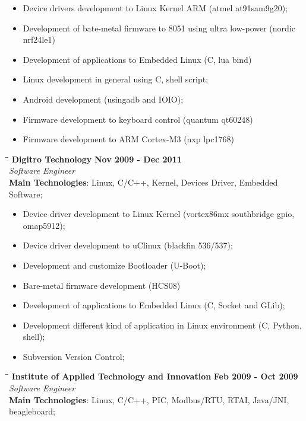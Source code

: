 \documentclass[margin]{eder}
\begin{document}
\begin{resume}
\begin{itemize}
  \item Device drivers development to Linux Kernel ARM (atmel at91sam9g20);
  \item Development of bate-metal firmware to 8051 using ultra low-power (nordic nrf24le1)
  \item Development of applications to Embedded Linux (C, lua bind)
  \item Linux development in general using C, shell script;
  \item Android development (usingadb and IOIO);
  \item Firmware development to keyboard control (quantum qt60248)
  \item Firmware development to ARM Cortex-M3 (nxp lpc1768)
\end{itemize}

\vspace{2mm}
  \begin{tabbing}
    \hspace{2.3in}\= \hspace{1.7in}\= \kill
    \textbf{Digitro Technology}    \>\>\textbf{Nov 2009 - Dec 2011}\\
    \textit{Software Engineer}\\   
    \textbf{Main Technologies}: Linux, C/C++, Kernel, Devices Driver, Embedded Software;
  \end{tabbing}\vspace{-20pt}
\vspace{6mm}

\begin{itemize}
  \item Device driver development to Linux Kernel (vortex86mx southbridge gpio, omap5912);
  \item Device driver development to uClinux (blackfin 536/537);
  \item Development and customize Bootloader (U-Boot);
  \item Bare-metal firmware development (HCS08)
  \item Development of applications to Embedded Linux (C, Socket and GLib);
  \item Development different kind of application in Linux environment (C, Python, shell);
  \item Subversion Version Control;
\end{itemize}
   
\vspace{2mm}
   \begin{tabbing}
   \hspace{2.3in}\= \hspace{1.5in}\= \kill
    \textbf{Institute of Applied Technology and Innovation}    \>\>\textbf{Feb 2009 - Oct 2009}\\
    \textit{Software Engineer}\\   
    \textbf{Main Technologies}: Linux, C/C++, PIC, Modbus/RTU, RTAI, Java/JNI, beagleboard;
   \end{tabbing}\vspace{-20pt}
\vspace{6mm}
    

\end{resume}
\end{document}
